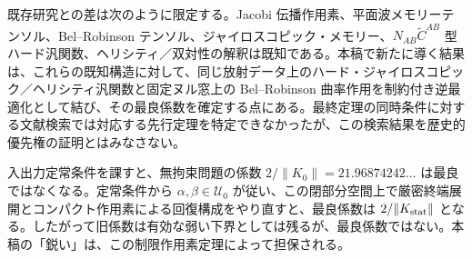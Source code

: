 既存研究との差は次のように限定する。Jacobi 伝播作用素、平面波メモリーテンソル、Bel--Robinson テンソル、ジャイロスコピック・メモリー、$N_{AB}\widetilde C^{AB}$ 型ハード汎関数、ヘリシティ／双対性の解釈は既知である\cite{Flanagan2020,Harte2025,SerajOblak2023,FayeSeraj2025}。本稿で新たに導く結果は、これらの既知構造に対して、同じ放射データ上のハード・ジャイロスコピック／ヘリシティ汎関数と固定ヌル窓上の Bel--Robinson 曲率作用を制約付き逆最適化として結び、その最良係数を確定する点にある。最終定理の同時条件に対する文献検索では対応する先行定理を特定できなかったが、この検索結果を歴史的優先権の証明とはみなさない。

入出力定常条件を課すと、無拘束問題の係数 $2/\|K_0\|=21.96874242\ldots$ は最良ではなくなる。定常条件から $\alpha,\beta\in\mathcal U_0$ が従い、この閉部分空間上で厳密終端展開とコンパクト作用素による回復構成をやり直すと、最良係数は $2/\|K_{\rm stat}\|$ となる。したがって旧係数は有効な弱い下界としては残るが、最良係数ではない。本稿の「鋭い」は、この制限作用素定理によって担保される。
